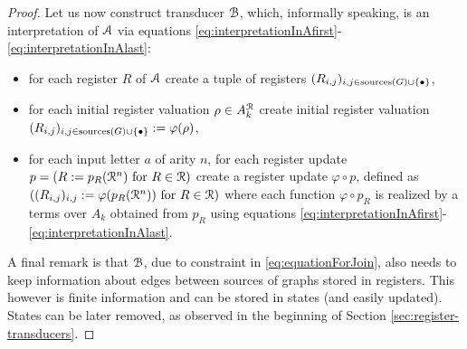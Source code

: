 \begin{proof}
	Let us now construct transducer ${\mathcal B}$, which, informally speaking, is an interpretation of ${\mathcal A}$ via equations \eqref{eq:interpretationInAfirst}-\eqref{eq:interpretationInAlast}:
	\begin{itemize}
		\item for each register $R$ of ${\mathcal A}$ create a tuple of registers $(R_{i,j})_{i, j \in \operatorname{sources}(G) \cup \{\bullet\}}$,
		\item for each initial register valuation $\rho \in A_k^{\mathcal{R}}$ create initial register valuation $(R_{i,j})_{i,j\in\operatorname{sources}(G) \cup \{\bullet\}} := \varphi(\rho)$,
		\item for each input letter $a$ of arity $n$, for each register update $p = (R:= p_R(\mathcal{R}^n) \text{ for } R \in \mathcal{R})$ create a register update $\varphi\circ p$, defined as $((R_{i,j})_{i,j} := \varphi(p_R(\mathcal{R}^n)) \text{ for } R\in\mathcal{R})$ where each function $\varphi\circ p_R$ is realized by a terms over $A_k$ obtained from $p_R$ using equations \eqref{eq:interpretationInAfirst}-\eqref{eq:interpretationInAlast}.
	\end{itemize}
	A final remark is that ${\mathcal B}$, due to constraint in \eqref{eq:equationForJoin}, also needs to keep information about edges between sources of graphs stored in registers. This however is finite information and can be stored in states (and easily updated). States can be later removed, as observed in the beginning of Section \ref{sec:register-transducers}.
\end{proof}

